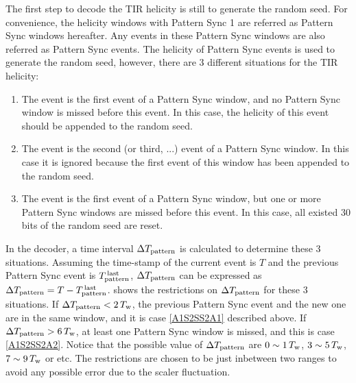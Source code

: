 The first step to decode the TIR helicity is still to generate the random seed. For convenience, the helicity windows with Pattern Sync 1 are referred as Pattern Sync windows hereafter. Any events in these Pattern Sync windows are also referred as Pattern Sync events. The helicity of Pattern Sync events is used to generate the random seed, however, there are 3 different situations for the TIR helicity:
\begin{enumerate}[parsep=0pt]
\item \label{A1S2SS2A1} The event is the first event of a Pattern Sync window, and no Pattern Sync window is missed before this event. In this case, the helicity of this event should be appended to the random seed.
\item The event is the second (or third, ...) event of a Pattern Sync window. In this case it is ignored because the first event of this window has been appended to the random seed.
\item \label{A1S2SS2A2} The event is the first event of a Pattern Sync window, but one or more Pattern Sync windows are missed before this event. In this case, all existed 30 bits of the random seed are reset.
\end{enumerate}
In the decoder, a time interval $\Delta T_{\text{pattern}}$ is calculated to determine these 3 situations. Assuming the time-stamp of the current event is $T$ and the previous Pattern Sync event is $T^{\,\text{last}}_{\text{pattern}}$, $\Delta T_{\text{pattern}}$ can be expressed as $\Delta T_{\text{pattern}}=T-T^{\,\text{last}}_{\text{pattern}}$.  shows the restrictions on $\Delta T_{\text{pattern}}$ for these 3 situations. If $\Delta T_{\text{pattern}}<2\,T_{\text{w}}$, the previous Pattern Sync event and the new one are in the same window, and it is case \ref{A1S2SS2A1} described above. If $\Delta T_{\text{pattern}}>6\,T_{\text{w}}$, at least one Pattern Sync window is missed, and this is case \ref{A1S2SS2A2}. Notice that the possible value of $\Delta T_{\text{pattern}}$ are $0\sim1\,T_{\text{w}}$, $3\sim5\,T_{\text{w}}$, $7\sim9\,T_{\text{w}}$ or etc. The restrictions are chosen to be just inbetween two ranges to avoid any possible error due to the scaler fluctuation.


